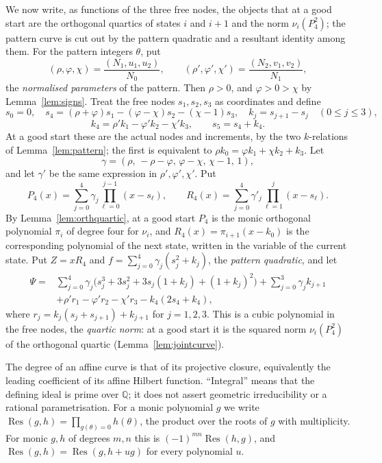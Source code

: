 \documentclass[11pt]{article}
\theoremstyle{definition}
\theoremstyle{remark}
\begin{document}
We now write, as functions of the three free nodes, the objects that at a good
start are the orthogonal quartics of states $i$ and $i+1$ and the norm
$\nu_i(P_4^2)$; the pattern curve is cut out by the pattern quadratic and a
resultant identity among them. For the pattern integers $\theta$, put
\begin{equation}\label{eq:jointbar}
 (\rho,\varphi,\chi)=\frac{(N_1,u_1,u_2)}{N_0},\qquad
 (\rho',\varphi',\chi')=\frac{(N_2,v_1,v_2)}{N_1},
\end{equation}
the \emph{normalised parameters} of the pattern. Then $\rho>0$, and
$\varphi>0>\chi$ by Lemma~\ref{lem:signs}.
Treat the free nodes $s_1,s_2,s_3$ as coordinates and define
\[
 s_0=0,\quad
 s_4=(\rho+\varphi)s_1-(\varphi-\chi)s_2-(\chi-1)s_3,\quad
 k_j=s_{j+1}-s_j\quad(0\le j\le3),
\]
\[
 k_4=\rho' k_1-\varphi' k_2-\chi' k_3,\qquad s_5=s_4+k_4.
\]
At a good start these are the actual nodes and increments, by the two
$k$-relations of Lemma~\ref{lem:pattern}; the first is equivalent to
$\rho k_0=\varphi k_1+\chi k_2+k_3$. Let
\[
 \gamma=(\rho,\,-\rho-\varphi,\,\varphi-\chi,\,\chi-1,\,1),
\]
and let $\gamma'$ be the same expression in $\rho',\varphi',\chi'$. Put
\[
 P_4(x)=\sum_{j=0}^4\gamma_j\prod_{\ell=0}^{j-1}(x-s_\ell),
 \qquad
 R_4(x)=\sum_{j=0}^4\gamma'_j\prod_{\ell=1}^{j}(x-s_\ell).
\]
By Lemma~\ref{lem:orthquartic}, at a good start $P_4$ is the
monic orthogonal polynomial $\pi_i$ of degree four for $\nu_i$, and
$R_4(x)=\pi_{i+1}(x-k_0)$ is the corresponding polynomial of the next state,
written in the variable of the current state. Put $Z=xR_4$ and
$f=\sum_{j=0}^4\gamma_j(s_j^2+k_j)$, the \emph{pattern quadratic}, and let
\begin{align*}
 \Psi={}&\sum_{j=0}^4\gamma_j
 \bigl(s_j^3+3s_j^2+3s_j(1+k_j)+(1+k_j)^2\bigr)
 +\sum_{j=0}^3\gamma_jk_{j+1}\\
 &+\rho' r_1-\varphi' r_2-\chi' r_3-k_4(2s_4+k_4),
\end{align*}
where $r_j=k_j(s_j+s_{j+1})+k_{j+1}$ for $j=1,2,3$. This is a cubic
polynomial in the free nodes, the \emph{quartic norm}: at a good start it is
the squared norm $\nu_i(P_4^2)$ of the orthogonal quartic
(Lemma~\ref{lem:jointcurve}).

The degree of an affine curve is that of its projective closure, equivalently
the leading coefficient of its affine Hilbert function.
``Integral'' means that the defining ideal is prime over $\mathbb Q$; it does
not assert geometric irreducibility or a rational parametrisation.
For a monic polynomial $g$ we write
$\operatorname{Res}(g,h)=\prod_{g(\theta)=0}h(\theta)$, the product over the
roots of $g$ with multiplicity. For monic $g,h$ of degrees $m,n$ this is
$(-1)^{mn}\operatorname{Res}(h,g)$, and
$\operatorname{Res}(g,h)=\operatorname{Res}(g,h+ug)$ for every polynomial $u$.
\end{document}
